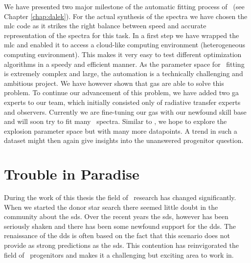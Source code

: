 We have presented two major milestone of the automatic fitting process of \sneia\ (see Chapter \ref{chap:dalek}). For the actual synthesis of the spectra we have chosen the \gls{mlc} code as it strikes the right balance between speed and accurate representation of the spectra for this task. 
In a first step we have wrapped the \gls{mlc} and enabled it to access a cloud-like computing environment (heterogeneous computing environment). This makes it very easy to test different optimization algorithms in a speedy and efficient manner. As the parameter space for \snia\ fitting is extremely complex and large, the automation is a technically challenging and ambitious project. We have however shown that \glspl{ga} are able to solve this problem. To continue our advancement of this problem, we have added two \gls{ga} experts to our team, which initially consisted only of radiative transfer experts and observers. Currently we are fine-tuning our \glspl{ga} with our newfound skill base and will soon try to fit many \snia\ spectra. Similar to \citet{2007Sci...315..825M}, we hope to explore the explosion parameter space but with many more datapoints. A trend in such a dataset might then again give insights into the unanswered progenitor question.

\section{Trouble in Paradise}

During the work of this thesis the field of \snia\ research has changed significantly. When we started the donor star search there seemed little doubt in the community about the \gls{sds}. Over the recent years the \gls{sds}, however has been seriously shaken and there has been some newfound support for the \gls{dds}. The renaissance of the \gls{dds} is often based on the fact that this scenario does not provide as strong predictions as the \gls{sds}. This contention has reinvigorated the field of \snia\ progenitors and makes it a challenging but exciting area to work in.

